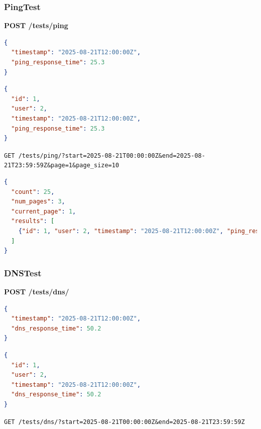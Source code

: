 \documentclass{report}
\begin{document}
\subsubsection{PingTest}
\textbf{POST /tests/ping}
\begin{lstlisting}[language=json]
{
  "timestamp": "2025-08-21T12:00:00Z",
  "ping_response_time": 25.3
}
\end{lstlisting}

\begin{lstlisting}[language=json]
{
  "id": 1,
  "user": 2,
  "timestamp": "2025-08-21T12:00:00Z",
  "ping_response_time": 25.3
}
\end{lstlisting}

\begin{center}
	\begin{latin}
		\texttt{GET \hspace{1cm} /tests/ping/?start=2025-08-21T00:00:00Z\&end=2025-08-21T23:59:59Z\&page=1\&page\_size=10}
	\end{latin}
\end{center}

\begin{lstlisting}[language=json]
{
  "count": 25,
  "num_pages": 3,
  "current_page": 1,
  "results": [
    {"id": 1, "user": 2, "timestamp": "2025-08-21T12:00:00Z", "ping_response_time": 25.3}
  ]
}
\end{lstlisting}

\subsubsection{DNSTest}
\textbf{POST /tests/dns/}
\begin{lstlisting}[language=json]
{
  "timestamp": "2025-08-21T12:00:00Z",
  "dns_response_time": 50.2
}
\end{lstlisting}

\begin{lstlisting}[language=json]
{
  "id": 1,
  "user": 2,
  "timestamp": "2025-08-21T12:00:00Z",
  "dns_response_time": 50.2
}
\end{lstlisting}

\begin{center}
	\begin{latin}
		\texttt{GET \hspace{1cm} /tests/dns/?start=2025-08-21T00:00:00Z\&end=2025-08-21T23:59:59Z}
	\end{latin}
\end{center}
\end{document}
